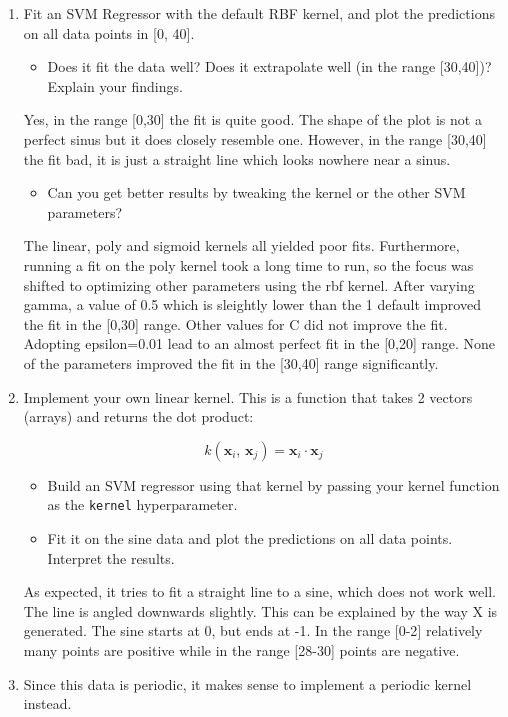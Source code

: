 \documentclass[11pt]{article}
\providecommand{\tightlist}{%
      \setlength{\itemsep}{0pt}\setlength{\parskip}{0pt}}
\begin{document}
    \begin{enumerate}
\def\labelenumi{\arabic{enumi}.}
\item
  Fit an SVM Regressor with the default RBF kernel, and plot the
  predictions on all data points in {[}0, 40{]}.

  \begin{itemize}
  \tightlist
  \item
    Does it fit the data well? Does it extrapolate well (in the range
    {[}30,40{]})? Explain your findings.
  \end{itemize}

  Yes, in the range {[}0,30{]} the fit is quite good. The shape of the
  plot is not a perfect sinus but it does closely resemble one. However,
  in the range {[}30,40{]} the fit bad, it is just a straight line which
  looks nowhere near a sinus.

  \begin{itemize}
  \tightlist
  \item
    Can you get better results by tweaking the kernel or the other SVM
    parameters?
  \end{itemize}

  The linear, poly and sigmoid kernels all yielded poor fits.
  Furthermore, running a fit on the poly kernel took a long time to run,
  so the focus was shifted to optimizing other parameters using the rbf
  kernel. After varying gamma, a value of 0.5 which is sleightly lower
  than the 1 default improved the fit in the {[}0,30{]} range. Other
  values for C did not improve the fit. Adopting epsilon=0.01 lead to an
  almost perfect fit in the {[}0,20{]} range. None of the parameters
  improved the fit in the {[}30,40{]} range significantly.
\item
  Implement your own linear kernel. This is a function that takes 2
  vectors (arrays) and returns the dot product:

  \[k(\mathbf{x}_i,\,\mathbf{x}_j) = \mathbf{x}_i \cdot \mathbf{x}_j\]

  \begin{itemize}
  \tightlist
  \item
    Build an SVM regressor using that kernel by passing your kernel
    function as the \texttt{kernel} hyperparameter.
  \item
    Fit it on the sine data and plot the predictions on all data points.
    Interpret the results.
  \end{itemize}

  As expected, it tries to fit a straight line to a sine, which does not
  work well. The line is angled downwards slightly. This can be
  explained by the way X is generated. The sine starts at 0, but ends at
  -1. In the range {[}0-2{]} relatively many points are positive while
  in the range {[}28-30{]} points are negative.
\item
  Since this data is periodic, it makes sense to implement a periodic
  kernel instead.


\end{enumerate}
\end{document}
